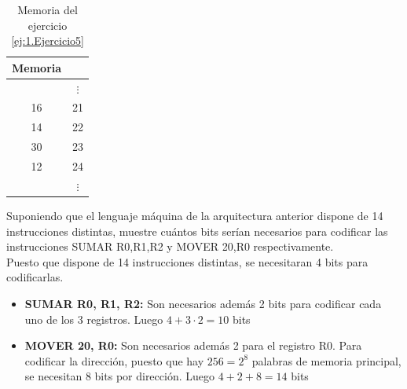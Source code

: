 \begin{ejercicio}
    \begin{table}[H]
        \centering
        \begin{tabular}{|c|c}
            Memoria & \\ \hline
            & $\vdots$ \\
            16 & 21\\
            14 & 22\\
            30 & 23\\
            12 & 24\\
            & $\vdots$ \\
        \end{tabular}
        \caption{Memoria del ejercicio \ref{ej:1.Ejercicio5}}
        \label{tab:MemEjercicio5}
    \end{table}
\end{ejercicio}

\begin{ejercicio}
    Suponiendo que el lenguaje máquina de la arquitectura anterior dispone de 14 instrucciones distintas, muestre cuántos bits serían necesarios para codificar las instrucciones SUMAR R0,R1,R2 y MOVER 20,R0 respectivamente.\\
    
    Puesto que dispone de 14 instrucciones distintas, se necesitaran 4 bits para codificarlas. 
    \begin{itemize}
        \item \textbf{SUMAR R0, R1, R2: } Son necesarios además 2 bits para codificar cada uno de los 3 registros. Luego $4+3\cdot2 = 10$ bits
        \item \textbf{MOVER 20, R0: } Son necesarios además 2 para el registro R0. Para codificar la dirección, puesto que hay $256=2^8$ palabras de memoria principal, se necesitan 8 bits por dirección. Luego $4+2+8=14$ bits
    \end{itemize}
    
\end{ejercicio}

